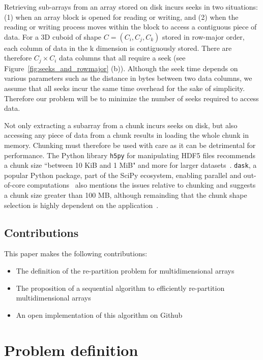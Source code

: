 \documentclass[conference]{IEEEtran}
\begin{document}
Retrieving sub-arrays from an array stored on disk incurs seeks in two
situations: (1) when an array block is opened for reading or writing, and (2)
when the reading or writing process moves within the block to access a
contiguous piece of data. For a 3D cuboid of shape $C = (C_i, C_j, C_k)$ stored
in row-major order, each column of data in the k dimension is contiguously
stored. There are therefore $C_j \times C_i$ data columns that all require a
seek (see Figure~\ref{fig:seeks_and_rowmajor} (b)).
Although the seek time depends on various parameters such as the distance
in bytes between two data columns, we assume that all seeks incur the same time
overhead for the sake of simplicity. Therefore our problem will be to minimize
the number of seeks required to access data.

Not only extracting a subarray from a chunk incurs seeks on disk, but also
accessing any piece of data from a chunk results in loading the whole chunk in
memory. Chunking must therefore be used with care as it can be detrimental for
performance. The Python library \texttt{h5py} for manipulating HDF5 files
recommends a chunk size ``between 10 KiB and 1 MiB" and more for larger
datasets~\cite{collette_2014}. \texttt{dask}, a popular Python package, part of
the SciPy ecosystem, enabling parallel and out-of-core
computations~\cite{matthew_rocklin-proc-scipy-2015} also mentions the issues
relative to chunking and suggests a chunk size greater than 100 MB, although
remainding that the chunk shape selection is highly dependent on the
application~\cite{rocklin_bourbeau_2019}.

\subsection{Contributions}
This paper makes the following contributions:
\begin{itemize}
  \item The definition of the re-partition problem for multidimensional arrays
  \item The proposition of a sequential algorithm to efficiently
  re-partition multidimensional arrays
  \item An open implementation of this algorithm on Github
\end{itemize}

\section{Problem definition}
\end{document}
